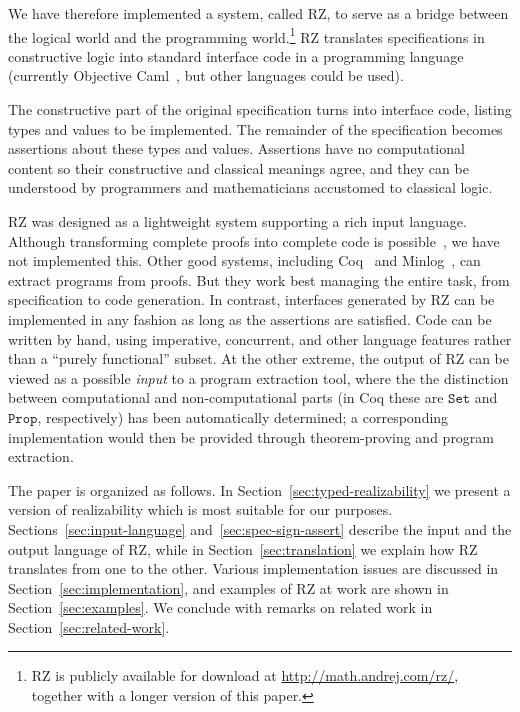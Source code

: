 
We have therefore implemented a system, called RZ, to serve as a
bridge between the logical world and the programming world.\footnote{RZ
  is publicly available for download at
  \url{http://math.andrej.com/rz/}, together with a longer version of
  this paper.} RZ translates specifications in
constructive logic into standard interface code in a programming
language (currently Objective Caml~\cite{ocaml}, but other languages
could be used).

The constructive part of the original specification turns into
interface code,
listing types and values to be implemented. The remainder of
the specification becomes assertions about these types and values.
Assertions have no computational content so their constructive
and classical meanings agree, and they can
be understood by programmers and mathematicians accustomed to
classical logic.


RZ was designed as a lightweight system
supporting a rich input language. Although transforming complete
proofs into complete code is possible~\cite{komagata+:tr95}, we have not
implemented this. Other good systems, including Coq~\cite{coqart} and
Minlog~\cite{benl98:_proof_theor_work}, can
extract programs from proofs. But they work best managing the entire
task, from specification to code generation. In contrast, interfaces generated by RZ can be
implemented in any fashion as long as the assertions are satisfied.
Code can be written by hand, using imperative, concurrent, and other language features
rather than a ``purely functional'' subset. 
\iflong
At the other
extreme, the output of RZ can be viewed as a possible \emph{input} to
a program extraction tool, where the the distinction between
computational and non-computational parts (in Coq these are
$\mathtt{Set}$ and $\mathtt{Prop}$, respectively) has been
automatically determined; a corresponding implementation would then be
provided through theorem-proving and program extraction.


The paper is organized as follows. In
Section~\ref{sec:typed-realizability} we present a version of
realizability which is most suitable for our purposes.
Sections~\ref{sec:input-language} and~\ref{sec:spec-sign-assert}
describe the input and the output language of RZ, while in
Section~\ref{sec:translation} we explain how RZ translates from one to
the other. Various implementation issues are discussed in
Section~\ref{sec:implementation}, and examples of RZ at work are shown
in Section~\ref{sec:examples}. We conclude with remarks on related
work in Section~\ref{sec:related-work}.
\fi %


